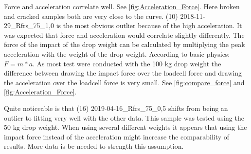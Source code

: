 Force and acceleration correlate well. See \autoref{fig:Acceleration_Force}. Here broken and cracked samples both are very close to the curve. (10) 2018-11-29\_Rfrs\_75\_1,0 is the most obvious outlier because of the high acceleration. 
It was expected that force and acceleration would correlate slightly differently. The force of the impact of the drop weight can be calculated by multiplying the peak acceleration with the weight of the drop weight. According to basic physics: \(F = m * a\).  
As most test were conducted with the 100 kg drop weight the difference between drawing the impact force over the loadcell force and drawing the acceleration over the loadcell force is very small. See \autoref{fig:compare_force} and \autoref{fig:Acceleration_Force}.

Quite noticeable is that (16) 2019-04-16\_Rfrs\_75\_0,5 shifts from being an outlier to fitting very well with the other data. This sample was tested using the 50 kg drop weight. When using several different weights it appears that using the impact force instead of the acceleration might increase the comparability of results. More data is be needed to strength this assumption.

